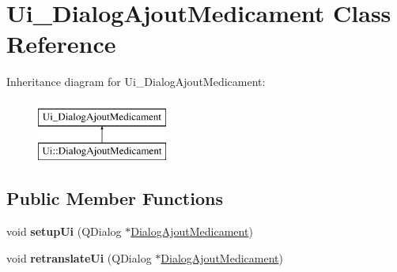\hypertarget{classUi__DialogAjoutMedicament}{\section{Ui\-\_\-\-Dialog\-Ajout\-Medicament Class Reference}
\label{classUi__DialogAjoutMedicament}
}
Inheritance diagram for Ui\-\_\-\-Dialog\-Ajout\-Medicament\-:\begin{figure}[H]
\begin{center}
\leavevmode
\includegraphics[height=2.000000cm]{classUi__DialogAjoutMedicament}
\end{center}
\end{figure}
\subsection*{Public Member Functions}
\begin{DoxyCompactItemize}
\item 
\hypertarget{classUi__DialogAjoutMedicament_a976edec01e8af86119ce87115c8084b7}{void {\bfseries setup\-Ui} (Q\-Dialog $\ast$\hyperlink{classDialogAjoutMedicament}{Dialog\-Ajout\-Medicament})}\label{classUi__DialogAjoutMedicament_a976edec01e8af86119ce87115c8084b7}

\item 
\hypertarget{classUi__DialogAjoutMedicament_a8c71f7ac08cd1cadc3af5152af427d2e}{void {\bfseries retranslate\-Ui} (Q\-Dialog $\ast$\hyperlink{classDialogAjoutMedicament}{Dialog\-Ajout\-Medicament})}\label{classUi__DialogAjoutMedicament_a8c71f7ac08cd1cadc3af5152af427d2e}

\end{DoxyCompactItemize}
